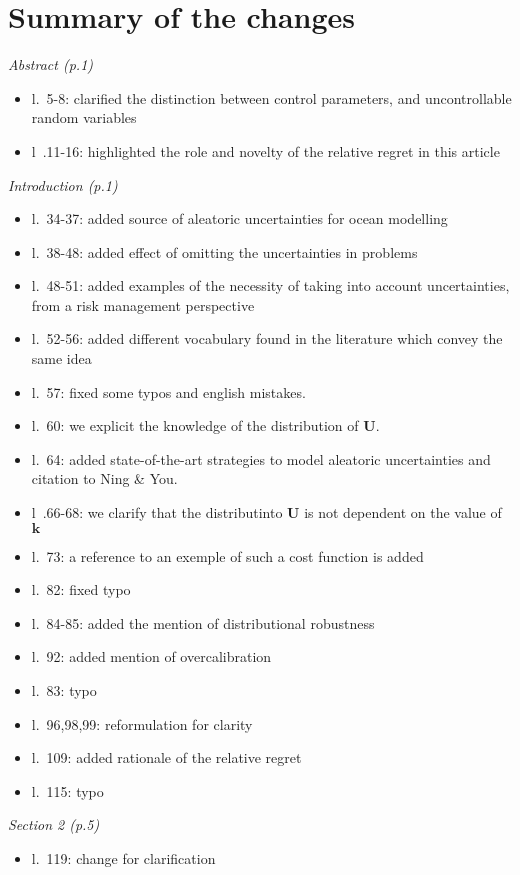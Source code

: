 \documentclass[a4paper,11pt]{article}
\begin{document}
\section{Summary of the changes}
\emph{Abstract (p.1)}
\begin{itemize}  
\item l.~5-8: clarified the distinction between control parameters, and uncontrollable random variables
\item l~.11-16: highlighted the role and novelty of the relative regret in this article
\end{itemize}
\emph{Introduction (p.1)}
\begin{itemize}
\item l.~34-37: added source of aleatoric uncertainties for ocean modelling
\item l.~38-48: added effect of omitting the uncertainties in problems
\item l.~48-51: added examples of the necessity of taking into account uncertainties, from a risk management perspective
\item l.~52-56: added different vocabulary found in the literature which convey the same idea
\item l.~57: fixed some typos and english mistakes.
\item l.~60: we explicit the knowledge of the distribution of $\mathbf{U}$.
\item l.~64: added state-of-the-art strategies to model aleatoric uncertainties and citation to Ning \& You.
\item l~.66-68: we clarify that the distributinto $\mathbf{U}$ is not dependent on the value of $\mathbf{k}$
\item l.~73: a reference to an exemple of such a cost function is added
\item l.~82: fixed typo
\item l.~84-85: added the mention of distributional robustness 
\item l.~92: added mention of overcalibration
\item l.~83: typo
\item l.~96,98,99: reformulation for clarity
\item l.~109: added rationale of the relative regret
\item l.~115: typo
\end{itemize}
\emph{Section 2 (p.5)}
\begin{itemize}
\item l.~119: change for clarification
\end{itemize}
\end{document}

